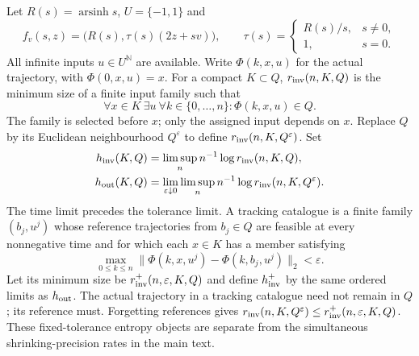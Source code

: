 \documentclass[11pt]{amsart}
\theoremstyle{definition}
\theoremstyle{remark}
\newcommand{\N}{\mathbb N}
\numberwithin{equation}{section}
\begin{document}
Let $R(s)=\operatorname{arsinh}s$, $U=\{-1,1\}$ and
\begin{equation}\label{eq:arsinhsystem}
f_v(s,z)=\bigl(R(s),\tau(s)(2z+sv)\bigr),\qquad
\tau(s)=\begin{cases}R(s)/s,&s\ne0,\\1,&s=0.\end{cases}
\end{equation}
All infinite inputs $u\in U^{\N}$ are available. Write
$\Phi(k,x,u)$ for the actual trajectory, with $\Phi(0,x,u)=x$.
For a compact $K\subset Q$, $r_{\rm inv}(n,K,Q)$ is the
minimum size of a finite input family such that
\[
\forall x\in K\ \exists u\ \forall k\in\{0,\ldots,n\}:
                             \Phi(k,x,u)\in Q.
\]
The family is selected before $x$; only the assigned input depends
on $x$. Replace $Q$ by its Euclidean neighbourhood $Q^\varepsilon$
to define $r_{\rm inv}(n,K,Q^\varepsilon)$. Set
\begin{align*}
h_{\rm inv}(K,Q)&=\limsup_n n^{-1}\log r_{\rm inv}(n,K,Q),\\
h_{\rm out}(K,Q)&=\lim_{\varepsilon\downarrow0}\limsup_n
 n^{-1}\log r_{\rm inv}(n,K,Q^\varepsilon).
\end{align*}
The time limit precedes the tolerance limit. A tracking catalogue
is a finite family $(b_j,u^j)$ whose reference trajectories from
$b_j\in Q$ are feasible at every nonnegative time and for which
each $x\in K$ has a member satisfying
\[
\max_{0\le k\le n}\|\Phi(k,x,u^j)-\Phi(k,b_j,u^j)\|_2
                                                       <\varepsilon.
\]
Let its minimum size be $r_{\rm inv}^+(n,\varepsilon,K,Q)$
and define $h_{\rm inv}^+$ by the same ordered limits as
$h_{\rm out}$. The actual trajectory in a tracking catalogue
need not remain in $Q$; its reference must. Forgetting references
gives $r_{\rm inv}(n,K,Q^\varepsilon)\le r_{\rm inv}^+(n,\varepsilon,K,Q)$.
These fixed-tolerance entropy objects are separate from the
simultaneous shrinking-precision rates in the main text.
\end{document}
